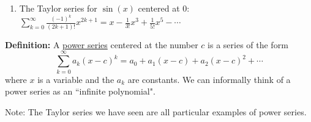 \documentclass[main]{subfiles}
\begin{document}
\begin{enumerate}
\begin{enumerate}
\begin{solution}
\fbox{$(-\infty,\infty)$}
\end{solution}



\item 
\begin{problem}[\vfill]
The Taylor series for $\sin(x)$ centered at 0: $\displaystyle \sum_{k=0}^\infty
    \frac{(-1)^k}{(2k+1)!}x^{2k+1} = x- \frac{1}{3!}x^3 + \frac{1}{5!}x^5 - \cdots$
\end{problem}

\begin{solution}
\fbox{$(-\infty,\infty)$}
\end{solution}

\end{enumerate}
  \end{enumerate}
  
  
  
  
 \pspace{\newpage}
  
  \begin{problemonly}
   \begin{framed}
\textbf{Definition:}  A \uline{power series} centered at the number $c$ is a series of the form
  $$\displaystyle \boxed{\sum_{k=0}^\infty a_k (x - c)^k=a_0 + a_1 (x - c) +
  a_2 (x - c)^2 + \cdots }$$ where $x$ is a variable and the $a_k$ are
  constants. We can informally think of a power series as an ``infinite polynomial".
  
  Note: The Taylor series we have seen are all particular examples of power series. 
  \end{framed}
  \end{problemonly}
\end{document}
